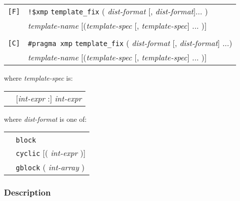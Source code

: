 \begin{tabular}{ll}
\verb![F]! & \verb|!$xmp| {\tt template\_fix} ( {\it dist-format} [,
 {\it dist-format}]... )\\
 & {\it template-name} [({\it template-spec} [, {\it template-spec}] ... )] \\
& \\
\verb![C]! & \verb|#pragma xmp|  {\tt template\_fix} ( {\it dist-format}
     [, {\it dist-format}] ...)\\
 & {\it template-name} [({\it template-spec} [, {\it template-spec}] ... )] \\
\end{tabular}
\vspace{0.3cm}

where {\it template-spec} is:

\begin{tabular}{ll}
 \hspace{0.5cm} & [{\it int-expr} :] {\it int-expr} \\
\end{tabular}
\vspace{0.3cm}

where {\it dist-format} is one of:

\begin{tabular}{ll}
 \hspace{0.5cm} & {\tt *} \\
 & {\tt block} \\
 & {\tt cyclic} [( {\it int-expr} )] \\
 & {\tt gblock} ( {\it int-array} ) \\
\end{tabular}

\subsubsection*{Description}

